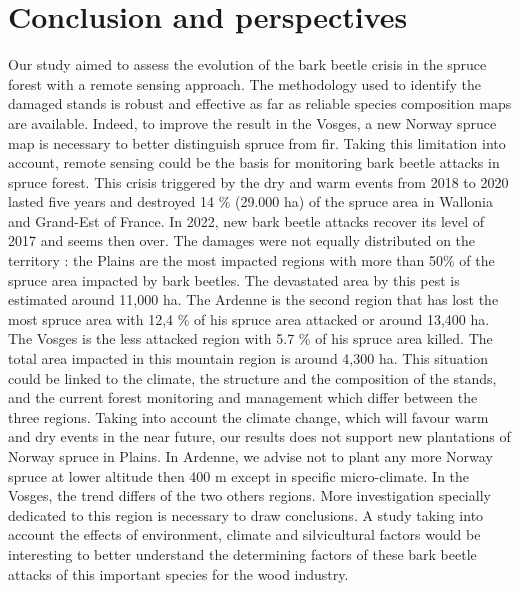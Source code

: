 \documentclass[3p,procedia]{elsarticle}
\begin{document}
\section{Conclusion and perspectives}
Our study aimed to assess the evolution of the bark beetle crisis in the spruce forest with a remote sensing approach.
The methodology used to identify the damaged stands is robust and effective as far as reliable species composition maps are available.
Indeed, to improve the result in the Vosges, a new Norway spruce map is necessary to better distinguish spruce from fir.
Taking this limitation into account, remote sensing could be the basis for monitoring bark beetle attacks in spruce forest.
This crisis triggered by the dry and warm events from 2018 to 2020 lasted five years and destroyed 14 \% (29.000 ha) of the spruce area in Wallonia and Grand-Est of France.
In 2022, new bark beetle attacks recover its level of 2017 and seems then over.
The damages were not equally distributed on the territory : the Plains are the most impacted regions with more than 50\% of the spruce area impacted by bark beetles.
The devastated area by this pest is estimated around 11,000 ha.
The Ardenne is the second region that has lost the most spruce area with  12,4 \% of his spruce area attacked or around 13,400 ha. 
The Vosges is the less attacked region with 5.7 \% of his spruce area killed. The total area impacted in this mountain region is around 4,300 ha.
This situation could be linked to the climate, the structure and the composition of the stands, and the current forest monitoring and management which differ between the three regions.
Taking into account the climate change, which will favour warm and dry events in the near future, our results does not support new plantations of Norway spruce in Plains.
In Ardenne, we advise not to plant any more Norway spruce at lower altitude then 400 m except in specific micro-climate.
In the Vosges, the trend differs of the two others regions.
More investigation specially dedicated to this region is necessary to draw conclusions.
A study taking into account the effects of environment, climate and silvicultural factors would be interesting to better understand the determining factors of these bark beetle attacks of this important species for the wood industry.

\end{document}
